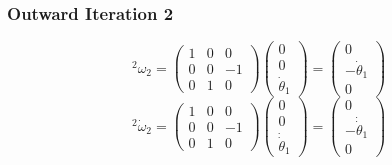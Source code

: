 \documentclass[10pt,a4paper]{article}
\begin{document}
\subsubsection*{Outward Iteration 2}

\begin{equation*}
  {}^{2}\omega_{2} = \begin{pmatrix}
    1 & 0 & 0\\
    0 & 0 & -1\\
    0 & 1 & 0
  \end{pmatrix} \begin{pmatrix}
    0\\0\\\dot{\theta}_{1}
  \end{pmatrix} = \begin{pmatrix}
    0\\-\dot{\theta}_{1}\\0
  \end{pmatrix}
\end{equation*}
\begin{equation*}
  {}^{2}\dot{\omega}_{2} = \begin{pmatrix}
    1 & 0 & 0\\
    0 & 0 & -1\\
    0 & 1 & 0
  \end{pmatrix} \begin{pmatrix}
    0\\0\\\dot{\dot{\theta}}_{1}
  \end{pmatrix} = \begin{pmatrix}
    0\\-\dot{\dot{\theta}}_{1}\\0
  \end{pmatrix}
\end{equation*}
\end{document}
